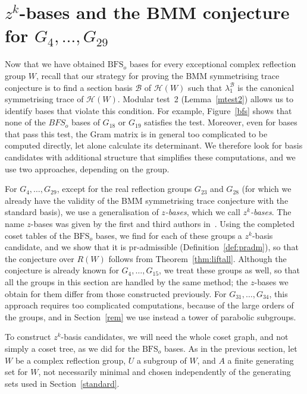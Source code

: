 \documentclass[11pt, reqno]{amsart}
\newcommand{\cB}{\mathcal{B}}
\newcommand{\cH}{\mathcal{H}}
\newcommand{\BFS}{\mathrm{BFS}}
\numberwithin{equation}{section}
\theoremstyle{remark}
\begin{document}
	
	\section{$z^k$-bases and the BMM conjecture   for $G_{4},\ldots,G_{29}$}\label{bases}
		Now that we have obtained $\BFS_o$ bases for every exceptional
		complex reflection group $W$, recall that our strategy for proving the BMM symmetrising
		trace conjecture is to find a section
		basis $\cB$ of $\cH(W)$  such that $\lambda^{\cB}_1$ is the
		canonical symmetrising trace of $\cH(W)$. Modular test~2 (Lemma~\ref{mtest2}) allows us to identify bases that violate this condition. For example, Figure~\ref{bfs} shows that none of the $BFS_o$ bases of $G_{18}$ or $G_{19}$ satisfies the test.
		Moreover, even for bases that pass this test, the Gram
		matrix is in general too complicated to be computed directly, let alone calculate its determinant. We therefore look for basis candidates with
		additional structure that simplifies these computations, and we use two
		approaches, depending on the group.
	 

For $G_4,\ldots,G_{29}$, except for the real reflection groups $G_{23}$ and $G_{28}$ (for which we already have the validity of the BMM symmetrising trace conjecture with the standard basis), we use a generalisation of \emph{$z$-bases}, which we call \emph{$z^k$-bases}. The name $z$-bases was given by the first and third authors in~\cite[Definition~2.4]{ChPf}. Using
the completed coset tables of the $\mathrm{BFS}_o$ bases, we find for
each of these groups a $z^k$-basis candidate, and we show that it is $\mathrm{pr}$-admissible (Definition~\ref{def:pradm}),
so that the conjecture over $R(W)$ follows from
Theorem~\ref{thm:liftall}. Although the conjecture is
already known for $G_4,\dots,G_{15}$, we treat these groups as well, so
that all the groups in this section are handled by the same method; the
$z$-bases we obtain for them differ from those constructed previously.
For $G_{31},\dots,G_{34}$, this approach requires too complicated
computations, because of the large orders of the groups, and in
Section~\ref{rem} we use instead a tower of parabolic subgroups.

To construct $z^k$-basis candidates, we will need the whole coset graph,
and not simply a coset tree, as we did for the $\mathrm{BFS}_o$ bases.  As in the previous section, let $W$ be a complex reflection group, $U$ a subgroup of $W$,
	and $A$ a finite generating set for $W$, not necessarily minimal and chosen
	independently of the generating sets used in
	Section~\ref{standard}. 
\end{document}
